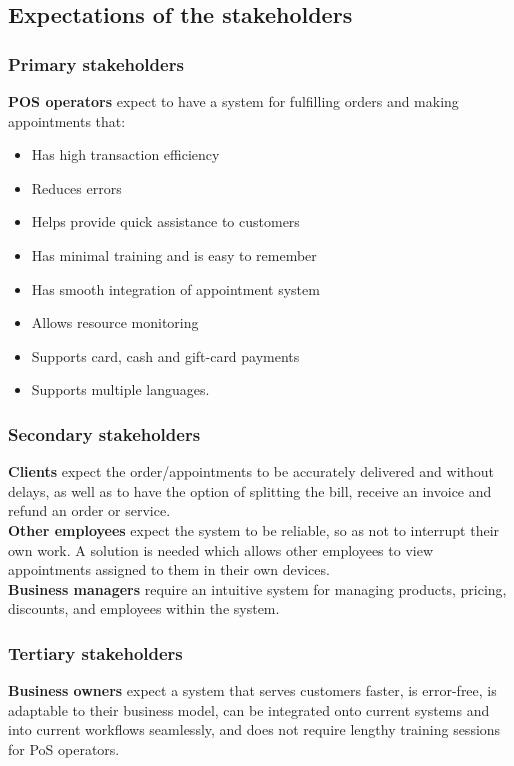 \documentclass{article}
\begin{document}
\subsection{Expectations of the stakeholders}
\subsubsection{Primary stakeholders}
\textbf{POS operators} expect to have a system for fulfilling orders and making appointments that:
\begin{itemize}
    \item Has high transaction efficiency
    \item Reduces errors
    \item Helps provide quick assistance to customers
    \item Has minimal training and is easy to remember
    \item Has smooth integration of appointment system
    \item Allows resource monitoring
    \item Supports card, cash and gift-card payments
    \item Supports multiple languages.
\end{itemize}


\subsubsection{Secondary stakeholders}

\textbf{Clients} expect the order/appointments to be accurately delivered and without delays, as well as to have the option of splitting the bill, receive an invoice and refund an order or service.
\textbf{\\ Other employees} expect the system to be reliable, so as not to interrupt their own work. A solution is needed which allows other employees to view appointments assigned to them in their own devices.
\textbf{\\ Business managers} require an intuitive system for managing products, pricing, discounts, and employees within the system.

\subsubsection{Tertiary stakeholders}

\textbf{Business owners} expect a system that serves customers faster, is error-free, is adaptable to their business model, can be integrated onto current systems and into current workflows seamlessly, and does not require lengthy training sessions for PoS operators.
\newpage
\end{document}
